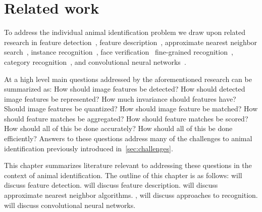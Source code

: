 \begin{comment}
    ./texfix.py --fixcap --dryrun
    ./texfix.py --findcite --unused-important
    ./texfix.py --findcite --close-keys
    fixtex --fpaths chapter2-related-work.tex --outline --asmarkdown --numlines=999 --shortcite
\end{comment}

\chapter{Related work}\label{chap:relatedwork} 

    To address the individual animal identification problem we draw upon related research in %
    feature detection~\cite{mikolajczyk_comparison_2005,tuytelaars_local_2007, perdoch_efficient_2009}, %
    feature description~\cite{lowe_distinctive_2004, mikolajczyk_performance_2005,simonyan_learning_2014,
      winder_picking_2009,zagoruyko_learning_2015,han_matchnet_2015}, %
    approximate nearest neighbor search~\cite{silpa_anan_optimised_2008, muja_fast_2009}, %
    instance recognition~\cite{sivic_efficient_2009,nister_scalable_2006,
      philbin_object_2007,jegou_hamming_2008,bo_efficient_2009, jegou_aggregating_2012, tolias_aggregate_2013}, %
    face verification~\cite{chopra_learning_2005,huang_labeled_2007,berg_tom_vs_pete_2012,
      chen_blessing_2013,taigman_deepface_2014} %
    fine-grained recognition~\cite{parkhi_cats_2012,berg_poof_2013, gavves_local_2014}, %
    category recognition~\cite{lazebnik_beyond_2006,zhang_local_2006,
      mccann_local_2012,boiman_defense_2008,sanchez_compressed_2013}, %
    and convolutional neural networks~\cite{krizhevsky_imagenet_2012, razavian_cnn_2014,
      zagoruyko_learning_2015,han_matchnet_2015,arandjelovic_netvlad_2016}.

    At a high level main questions addressed by the aforementioned research can be summarized as: How should image
    features be detected? How should detected image features be represented? How much invariance should features
    have? Should image features be quantized? How should image feature be matched? How should feature matches be
    aggregated? How should feature matches be scored? How should all of this be done accurately? How should all of
    this be done efficiently? Answers to these questions address many of the challenges to animal identification
    previously introduced in~\cref{sec:challenges}.

    This chapter summarizes literature relevant to addressing these questions in the context of animal
    identification. The outline of this chapter is as follows:  will discuss feature
    detection.  will discuss feature description.  will discuss approximate
    nearest neighbor algorithms. , will discuss approaches to recognition.
     will discuss convolutional neural networks.


